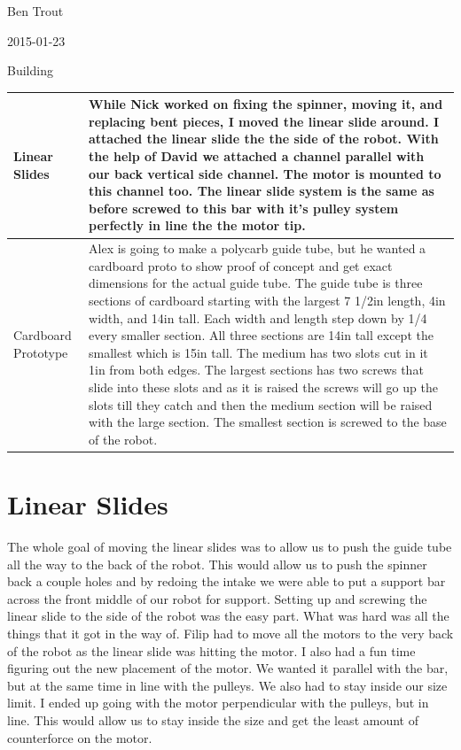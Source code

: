 Ben Trout

2015-01-23

Building

\begin{tabular}{|p{5cm}|p{5cm}|}
\hline
Linear Slides&
While Nick worked on fixing the spinner, moving it, and replacing bent pieces, I moved the linear slide around. I attached the linear slide the the side of the robot. With the help of David we attached a channel parallel with our back vertical side channel. The motor is mounted to this channel too. The linear slide system is the same as before screwed to this bar with it’s pulley system perfectly in line the the motor tip.
\\
\hline
Cardboard Prototype&
Alex is going to make a polycarb guide tube, but he wanted a cardboard proto to show proof of concept and get exact dimensions for the actual guide tube. The guide tube is three sections of cardboard starting with the largest 7 1/2in length, 4in width, and 14in tall. Each width and length step down by 1/4 every smaller section. All three sections are 14in tall except the smallest which is 15in tall. The medium has two slots cut in it 1in from both edges. The largest sections has two screws that slide into these slots and as it is raised the screws will go up the slots till they catch and then the medium section will be raised with the large section. The smallest section is screwed to the base of the robot. 
\\
\hline
\end{tabular}

\section*{Linear Slides}
The whole goal of moving the linear slides was to allow us to push the guide tube all the way to the back of the robot. This would allow us to push the spinner back a couple holes and by redoing the intake we were able to put a support bar across the front middle of our robot for support. Setting up and screwing the linear slide to the side of the robot was the easy part. What was hard was all the things that it got in the way of. Filip had to move all the motors to the very back of the robot as the linear slide was hitting the motor. I also had a fun time figuring out the new placement of the motor. We wanted it parallel with the bar, but at the same time in line with the pulleys. We also had to stay inside our size limit. I ended up going with the motor perpendicular with the pulleys, but in line. This would allow us to stay inside the size and get the least amount of counterforce on the motor. 

